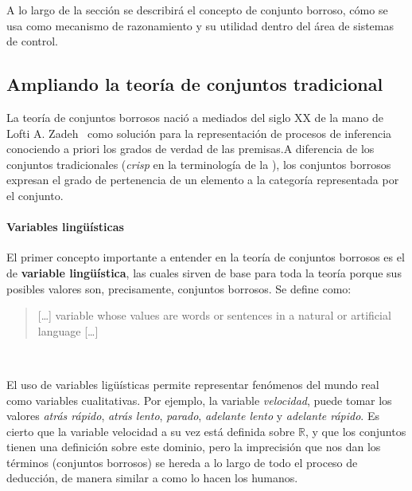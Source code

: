 A lo largo de la sección se describirá el concepto de conjunto borroso, cómo se usa como mecanismo de razonamiento y su utilidad dentro del área de sistemas de control.

\subsection{Ampliando la teoría de conjuntos tradicional}

La teoría de conjuntos borrosos nació a mediados del siglo XX de la mano de Lofti A. Zadeh~\cite{lofti1965fuzzy} como solución para la representación de procesos de inferencia conociendo a priori los grados de verdad de las premisas.A diferencia de los conjuntos tradicionales (\textit{crisp} en la terminología de la ), los conjuntos borrosos expresan el grado de pertenencia de un elemento a la categoría representada por el conjunto.

\paragraph{Variables lingüísticas}

El primer concepto importante a entender en la teoría de conjuntos borrosos es el de \textbf{variable lingüística}, las cuales sirven de base para toda la teoría porque sus posibles valores son, precisamente, conjuntos borrosos. Se define como:

\blockquote{[\ldots] variable whose values are words or sentences in a natural or artificial language [\ldots]}~\cite{zadeh1975concept}

El uso de variables ligüísticas permite representar fenómenos del mundo real como variables cualitativas. Por ejemplo, la variable \textit{velocidad}, puede tomar los valores \textit{atrás rápido}, \textit{atrás lento}, \textit{parado}, \textit{adelante lento} y \textit{adelante rápido}. Es cierto que la variable velocidad a su vez está definida sobre $\mathbb{R}$, y que los conjuntos tienen una definición sobre este dominio, pero la imprecisión que nos dan los términos (conjuntos borrosos) se hereda a lo largo de todo el proceso de deducción, de manera similar a como lo hacen los humanos.

